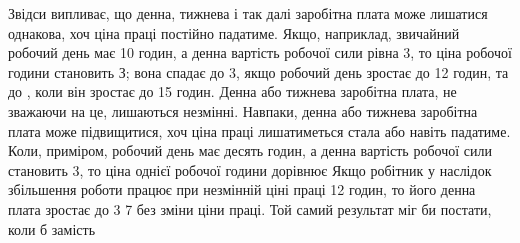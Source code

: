 Звідси випливає, що денна, тижнева і так далі заробітна плата
може лишатися однакова, хоч ціна праці постійно падатиме.
Якщо, наприклад, звичайний робочий день має 10 годин, а денна
вартість робочої сили рівна 3, то ціна робочої години
становить З; вона спадає до 3, якщо робочий день
зростає до 12 годин, та до , коли він зростає до 15 годин.
Денна або тижнева заробітна плата, не зважаючи на це,
лишаються незмінні. Навпаки, денна або тижнева заробітна
плата може підвищитися, хоч ціна праці лишатиметься стала або
навіть падатиме. Коли, приміром, робочий день має десять годин,
а денна вартість робочої сили становить 3, то ціна однієї
робочої години дорівнює  Якщо робітник у наслідок
збільшення роботи працює при незмінній ціні праці 12 годин,
то його денна плата зростає до 3 7 без зміни
ціни праці. Той самий результат міг би постати, коли б замість
\parbreak{}  %
